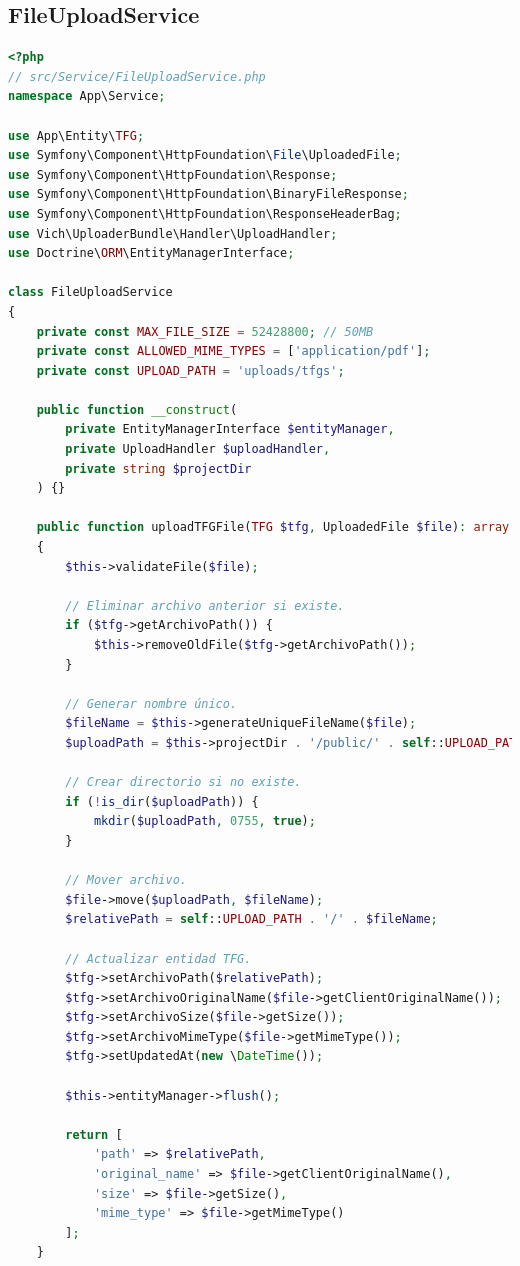 \documentclass[12pt,a4paper,oneside]{report}
\begin{document}
\subsection{FileUploadService}\label{fileuploadservice}

\begin{lstlisting}[language=PHP]
<?php
// src/Service/FileUploadService.php
namespace App\Service;

use App\Entity\TFG;
use Symfony\Component\HttpFoundation\File\UploadedFile;
use Symfony\Component\HttpFoundation\Response;
use Symfony\Component\HttpFoundation\BinaryFileResponse;
use Symfony\Component\HttpFoundation\ResponseHeaderBag;
use Vich\UploaderBundle\Handler\UploadHandler;
use Doctrine\ORM\EntityManagerInterface;

class FileUploadService
{
    private const MAX_FILE_SIZE = 52428800; // 50MB
    private const ALLOWED_MIME_TYPES = ['application/pdf'];
    private const UPLOAD_PATH = 'uploads/tfgs';

    public function __construct(
        private EntityManagerInterface $entityManager,
        private UploadHandler $uploadHandler,
        private string $projectDir
    ) {}

    public function uploadTFGFile(TFG $tfg, UploadedFile $file): array
    {
        $this->validateFile($file);
        
        // Eliminar archivo anterior si existe.
        if ($tfg->getArchivoPath()) {
            $this->removeOldFile($tfg->getArchivoPath());
        }

        // Generar nombre único.
        $fileName = $this->generateUniqueFileName($file);
        $uploadPath = $this->projectDir . '/public/' . self::UPLOAD_PATH;
        
        // Crear directorio si no existe.
        if (!is_dir($uploadPath)) {
            mkdir($uploadPath, 0755, true);
        }

        // Mover archivo.
        $file->move($uploadPath, $fileName);
        $relativePath = self::UPLOAD_PATH . '/' . $fileName;

        // Actualizar entidad TFG.
        $tfg->setArchivoPath($relativePath);
        $tfg->setArchivoOriginalName($file->getClientOriginalName());
        $tfg->setArchivoSize($file->getSize());
        $tfg->setArchivoMimeType($file->getMimeType());
        $tfg->setUpdatedAt(new \DateTime());

        $this->entityManager->flush();

        return [
            'path' => $relativePath,
            'original_name' => $file->getClientOriginalName(),
            'size' => $file->getSize(),
            'mime_type' => $file->getMimeType()
        ];
    }


\end{lstlisting}
\end{document}
